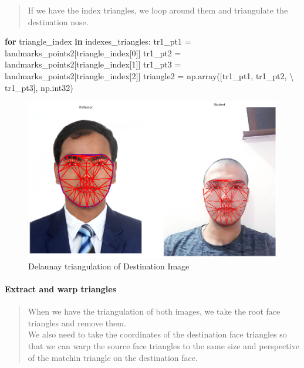 \documentclass[12pt, a4paper, twocolumn]{article}
\newenvironment{Shaded}{}{}
\newcommand{\KeywordTok}[1]{\textcolor[rgb]{0.00,0.44,0.13}{\textbf{#1}}}
\newcommand{\DecValTok}[1]{\textcolor[rgb]{0.25,0.63,0.44}{#1}}
\newcommand{\ControlFlowTok}[1]{\textcolor[rgb]{0.00,0.44,0.13}{\textbf{#1}}}
\newcommand{\OperatorTok}[1]{\textcolor[rgb]{0.40,0.40,0.40}{#1}}
\newcommand{\NormalTok}[1]{#1}
\let\oldparagraph\paragraph
\renewcommand{\paragraph}[1]{\oldparagraph{#1}\mbox{}}
\begin{document}
\begin{quote}
	If we have the index triangles, we loop around them and triangulate the
	destination nose.
\end{quote}

\begin{Shaded}
\small
\begin{Highlighting}[]
\ControlFlowTok{for}\NormalTok{ triangle_index }\KeywordTok{in}\NormalTok{ indexes_triangles:}
\NormalTok{    tr1_pt1 }\OperatorTok{=}\NormalTok{ landmarks_points2[triangle_index[}\DecValTok{0}\NormalTok{]]}
\NormalTok{    tr1_pt2 }\OperatorTok{=}\NormalTok{ landmarks_points2[triangle_index[}\DecValTok{1}\NormalTok{]]}
\NormalTok{    tr1_pt3 }\OperatorTok{=}\NormalTok{ landmarks_points2[triangle_index[}\DecValTok{2}\NormalTok{]]}
\NormalTok{    triangle2 }\OperatorTok{=}\NormalTok{ np.array([tr1_pt1, tr1_pt2, }\OperatorTok{\textbackslash{}}
\NormalTok{                          tr1_pt3], np.int32)}
\end{Highlighting}
\end{Shaded}

\begin{figure}
	\centering
	\includegraphics{meta/output_34_0.png}
	\caption{Delaunay triangulation of Destination Image}
\end{figure}

\paragraph{Extract and warp triangles}\label{header-n160}

\begin{quote}
	When we have the triangulation of both images, we take the root face
	triangles and remove them.\\
	We also need to take the coordinates of the destination face triangles
	so that we can warp the source face triangles to the same size and
	perspective of the matchin triangle on the destination face.
\end{quote}
\end{document}
